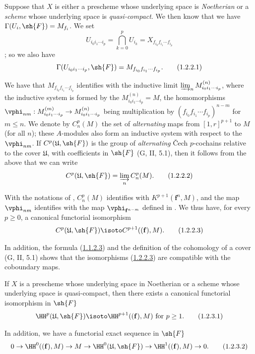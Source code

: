 \begin{env}[1.2.2]
\label{III.1.2.2}
Suppose that $X$ is either a prescheme whose underlying space is \emph{Noetherian} or a \emph{scheme} whose underlying space is \emph{quasi-compact}.
We then know  that we have $\Gamma(U_i,\sh{F})=M_{f_i}$.
We set
\[
  U_{i_0 i_1\cdots i_p}=\bigcap_{k=0}^p U_{i_k}=X_{f_{i_0}f_{i_1}\cdots f_{i_p}}
\]
; so we also have
\[
  \Gamma(U_{i_0 i_1\cdots i_p},\sh{F})=M_{f_{i_0}f_{i_1}\cdots f_{i_p}}.
  \tag{1.2.2.1}
\]

We have  that $M_{f_{i_0}f_{i_1}\cdots f_{i_p}}$ identifies with the inductive limit $\varinjlim_n M_{i_0 i_1\cdots i_p}^{(n)}$, where the inductive system is formed by the $M_{i_0 i_1\cdots i_p}^{(n)}=M$, the homomorphisms $\vphi_{nm}:M_{i_0 i_1\cdots i_p}^{(m)}\to M_{i_0 i_1\cdots i_p}^{(n)}$ being multiplication by $(f_{i_0}f_{i_1}\cdots f_{i_p})^{n-m}$ for $m\leq n$.
We denote by $C_n^p(M)$ the set of \emph{alternating} maps from $[1,r]^{p+1}$ to $M$ (for all $n$); these $A$-modules also form an inductive system with respect to the $\vphi_{nm}$.
If $C^p(\mathfrak{U},\sh{F})$ is the group of \emph{alternating} \v Cech $p$-cochains relative to the cover $\mathfrak{U}$, with coefficients in $\sh{F}$ (G, II, 5.1), then it follows from the above that we can write
\[
  C^p(\mathfrak{U},\sh{F})=\varinjlim_n C_n^p(M).
  \tag{1.2.2.2}
\]

With the notations of , $C_n^p(M)$ identifies with $K^{p+1}(\mathbf{f}^n,M)$, and the map $\vphi_{nm}$ identifies with the map $\vphi_{\mathbf{f}^{n-m}}$ defined in .
We thus have, for every $p\geq 0$, a canonical functorial isomorphism
\[
  C^p(\mathfrak{U},\sh{F})\isoto C^{p+1}((\mathbf{f}),M).
  \tag{1.2.2.3}\label{III.1.2.2.3}
\]

In addition, the formula (\hyperref[III.1.1.2.3]{1.1.2.3}) and the definition of the cohomology of a cover (G, II, 5.1) shows that the isomorphisms (\hyperref[III.1.2.2.3]{1.2.2.3}) are compatible with the coboundary maps.
\end{env}

\begin{proposition}[1.2.3]
\label{III.1.2.3}
If $X$ is a prescheme whose underlying space in Noetherian or a scheme whose underlying space is quasi-compact, then there exists a canonical functorial isomorphism in $\sh{F}$
\[
  \HH^p(\mathfrak{U},\sh{F})\isoto\HH^{p+1}((\mathbf{f}),M)\text{ for }p\geq 1.
  \tag{1.2.3.1}\label{III.1.2.3.1}
\]

In addition, we have a functorial exact sequence in $\sh{F}$
\[
  0\to\HH^0((\mathbf{f}),M)\to M\to\HH^0(\mathfrak{U},\sh{F})\to\HH^1((\mathbf{f}),M)\to 0.
  \tag{1.2.3.2}\label{III.1.2.3.2}
\]
\end{proposition}

